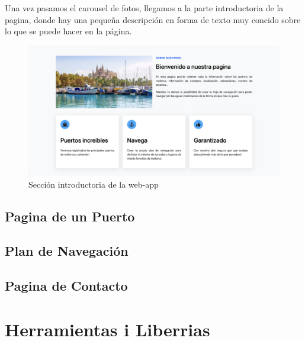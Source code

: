 \documentclass{article}
\begin{document}
\noindent Una vez pasamos el carousel de fotos, llegamos a la parte introductoria de la pagina, donde hay una pequeña descripción en forma de texto muy concido sobre lo que se puede hacer en la página.
\begin{figure}[ht]
    \centering
    \includegraphics[width=1.0\textwidth]{images/introduccion.png}
    \caption{Sección introductoria de la web-app}
\end{figure}
\subsection{Pagina de un Puerto}
\subsection{Plan de Navegación}
\subsection{Pagina de Contacto}

\noindent 
\section{Herramientas i Liberrias}
\end{document}
